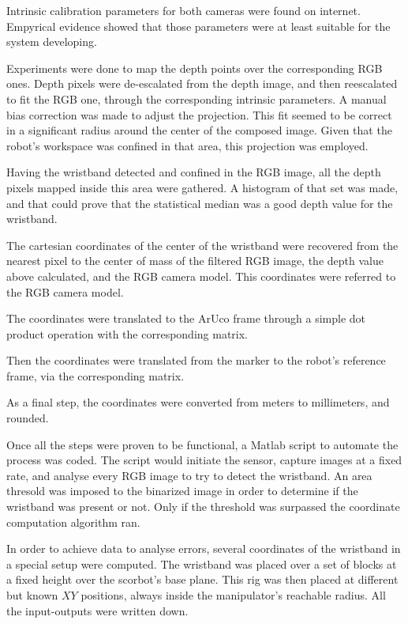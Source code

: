 \documentclass[12pt,a4paper,titlepage]{article}
\begin{document}
Intrinsic calibration parameters for both cameras were found on internet. Empyrical evidence showed that those parameters were at least suitable for the system developing. 

Experiments were done to map the depth points over the corresponding RGB ones. Depth pixels were de-escalated from the depth image, and then reescalated to fit the RGB one, through the corresponding intrinsic parameters. A manual bias correction was made to adjust the projection. This fit seemed to be correct in a significant radius around the center of the composed image. Given that the robot's workspace was confined in that area, this projection was employed.

Having the wristband detected and confined in the RGB image, all the depth pixels mapped inside this area were gathered. A histogram of that set was made, and that could prove that the statistical median was a good depth value for the wristband.

The cartesian coordinates of the center of the wristband were recovered from the nearest pixel to the center of mass of the filtered RGB image, the depth value above calculated, and the RGB camera model. This coordinates were referred to the RGB camera model.

The coordinates were translated to the ArUco frame through a simple dot product operation with the corresponding matrix.

Then the coordinates were translated from the marker to the robot's reference frame, via the corresponding matrix.

As a final step, the coordinates were converted from meters to millimeters, and rounded.

Once all the steps were proven to be functional, a Matlab script to automate the process was coded. The script would initiate the sensor, capture images at a fixed rate, and analyse every RGB image to try to detect the wristband. An area thresold was imposed to the binarized image in order to determine if the wristband was present or not. Only if the threshold was surpassed the coordinate computation algorithm ran.


In order to achieve data to analyse errors, several coordinates of the wristband in a special setup were computed. The wristband was placed over a set of blocks at a fixed height over the scorbot's base plane. This rig was then placed at different but known $XY$ positions, always inside the manipulator's reachable radius. All the input-outputs were written down.
\end{document}
